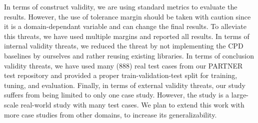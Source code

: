 In terms of construct validity, we are using standard metrics to evaluate the results. However, the use of tolerance margin should be taken with caution since it is a domain-dependant variable and can change the final results. To alleviate this threats, we have used multiple margins and reported all results. In terms of internal validity threats, we reduced the threat by not implementing the CPD baselines by ourselves and rather reusing existing libraries. In terms of conclusion validity threats, we have used many (888) real test cases from our PARTNER test repository and provided a proper train-validation-test split for training, tuning, and evaluation. Finally, in terms of external validity threats, our study suffers from being limited to only one case study. However, the study is a large-scale real-world study with many test cases. We plan to extend this work with more case studies from other domains, to increase its generalizability. 


 